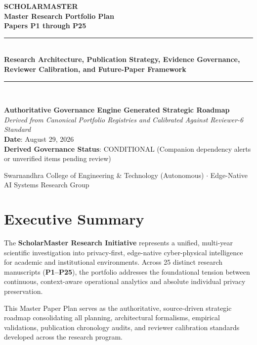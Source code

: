 \documentclass[11pt,a4paper]{article}
\begin{document}
\begin{titlepage}
    \centering
    \vspace*{1.5cm}
    {\Huge \textbf{\color{primaryblue} SCHOLARMASTER}}\\[0.6cm]
    {\LARGE \textbf{Master Research Portfolio Plan}}\\[0.3cm]
    {\Large \textbf{Papers P1 through P25}}\\[1.5cm]
    \rule{\linewidth}{1.5pt}\\[0.6cm]
    {\Large \textbf{Research Architecture, Publication Strategy, Evidence Governance, Reviewer Calibration, and Future-Paper Framework}}\\[0.4cm]
    \rule{\linewidth}{1.5pt}\\[2.0cm]
    \begin{minipage}{0.85\textwidth}
        \centering
        \textbf{Authoritative Governance Engine Generated Strategic Roadmap}\\
        \vspace{0.4cm}
        \textit{Derived from Canonical Portfolio Registries and Calibrated Against Reviewer-6 Standard}\\
        \vspace{0.4cm}
        \textbf{Date}: August 29, 2026\\
        \textbf{Derived Governance Status}: CONDITIONAL (Companion dependency alerts or unverified items pending review)
    \end{minipage}
    \vfill
    {\small Swarnandhra College of Engineering \& Technology (Autonomous) $\cdot$ Edge-Native AI Systems Research Group}
\end{titlepage}

\newpage
\tableofcontents
\newpage

\section*{Executive Summary}

The \textbf{ScholarMaster Research Initiative} represents a unified, multi-year scientific investigation into privacy-first, edge-native cyber-physical intelligence for academic and institutional environments. Across 25 distinct research manuscripts (\textbf{P1--P25}), the portfolio addresses the foundational tension between continuous, context-aware operational analytics and absolute individual privacy preservation.

This Master Paper Plan serves as the authoritative, source-driven strategic roadmap consolidating all planning, architectural formalisms, empirical validations, publication chronology audits, and reviewer calibration standards developed across the research program.
\end{document}
